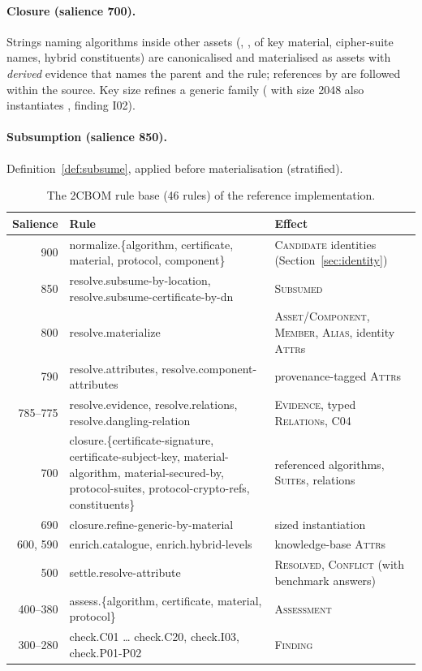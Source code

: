 \documentclass[11pt,a4paper]{article}
\newcommand{\twocbom}{2CBOM}
\theoremstyle{definition}
\theoremstyle{plain}
\begin{document}
\paragraph{Closure (salience 700).} Strings naming algorithms inside other assets
(, ,  of key material,
cipher-suite names, hybrid constituents) are canonicalised and materialised as assets with
\emph{derived} evidence that names the parent and the rule; references by  are
followed within the source. Key size refines a generic family ( with size 2048 also
instantiates , finding I02).

\paragraph{Subsumption (salience 850).} Definition~\ref{def:subsume}, applied before
materialisation (stratified).

\begin{table}[ht]\centering\footnotesize
\begin{tabularx}{\textwidth}{rXX}
\toprule
Salience & Rule & Effect\\
\midrule
900 & normalize.\{algorithm, certificate, material, protocol, component\} & \textsc{Candidate} identities (Section~\ref{sec:identity})\\
850 & resolve.subsume-by-location, resolve.subsume-certificate-by-dn & \textsc{Subsumed}\\
800 & resolve.materialize & \textsc{Asset}/\textsc{Component}, \textsc{Member}, \textsc{Alias}, identity \textsc{Attr}s\\
790 & resolve.attributes, resolve.component-attributes & provenance-tagged \textsc{Attr}s\\
785--775 & resolve.evidence, resolve.relations, resolve.dangling-relation & \textsc{Evidence}, typed \textsc{Relation}s, C04\\
700 & closure.\{certificate-signature, certificate-subject-key, material-algorithm, material-secured-by, protocol-suites, protocol-crypto-refs, constituents\} & referenced algorithms, \textsc{Suite}s, relations\\
690 & closure.refine-generic-by-material & sized instantiation\\
600, 590 & enrich.catalogue, enrich.hybrid-levels & knowledge-base \textsc{Attr}s\\
500 & settle.resolve-attribute & \textsc{Resolved}, \textsc{Conflict} (with benchmark answers)\\
400--380 & assess.\{algorithm, certificate, material, protocol\} & \textsc{Assessment}\\
300--280 & check.C01 \ldots{} check.C20, check.I03, check.P01-P02 & \textsc{Finding}\\
\bottomrule
\end{tabularx}
\caption{The \twocbom{} rule base (46 rules) of the reference implementation.}\label{tab:rules}
\end{table}
\end{document}
